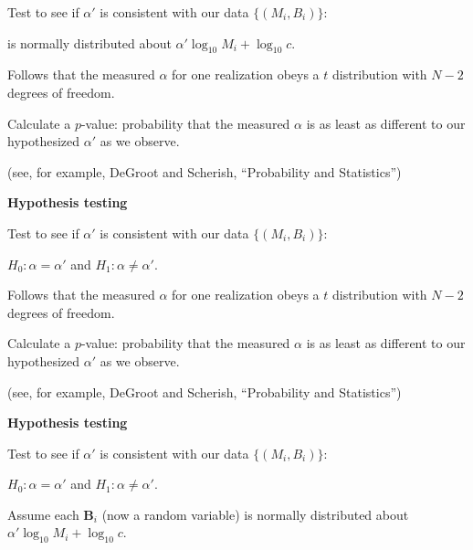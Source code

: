 {Test to see if $\alpha'$ is consistent
with our data $\{(M_i,B_i)\}$:


\inv

is normally distributed
about $\alpha' \log_{10} M_i + \log_{10} c$.

Follows that the measured $\alpha$ for
one realization obeys
a $t$ distribution with $N-2$ degrees of freedom.

Calculate a $p$-value: probability that the measured
$\alpha$ is as least as different to our hypothesized
$\alpha'$ as we observe.

{\tiny (see, for example, DeGroot and Scherish, ``Probability and Statistics'')}

\vis



  \textbf{Hypothesis testing}

Test to see if $\alpha'$ is consistent
with our data $\{(M_i,B_i)\}$:

$H_0: \alpha = \alpha'$ and $H_1: \alpha \ne \alpha'.$


\inv 

Follows that the measured $\alpha$ for
one realization obeys
a $t$ distribution with $N-2$ degrees of freedom.

Calculate a $p$-value: probability that the measured
$\alpha$ is as least as different to our hypothesized
$\alpha'$ as we observe.

{\tiny (see, for example, DeGroot and Scherish, ``Probability and Statistics'')}

\vis


  \textbf{Hypothesis testing}

Test to see if $\alpha'$ is consistent
with our data $\{(M_i,B_i)\}$:

$H_0: \alpha = \alpha'$ and $H_1: \alpha \ne \alpha'.$

Assume each $\mathbf{B}_i$ (now a random variable) 
is normally distributed
about $\alpha' \log_{10} M_i + \log_{10} c$.


\inv

}

